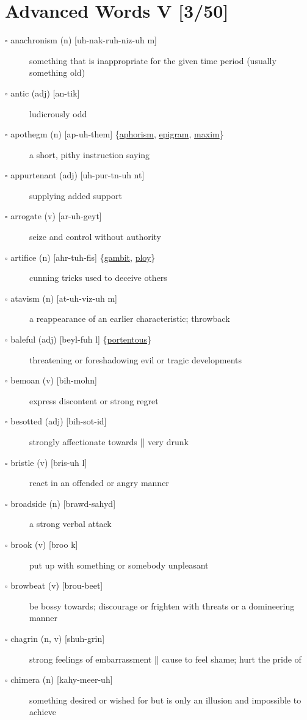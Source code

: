 \documentclass[11pt]{article}
\begin{document}
\section{Advanced Words V [3/50]}
\label{sec:org13c5537}
\begin{description}
\item[{$\square$ anachronism (n) [uh-nak-ruh-niz-uh m]}] something that is inappropriate for the given time period (usually something old)
\item[{$\square$ antic (adj) [an-tik]}] ludicrously odd
\item[{$\square$ \label{org3dc6b52}apothegm (n) [ap-uh-them] \{\hyperref[org7a7c9aa]{aphorism}, \hyperref[org46c3fc2]{epigram}, \hyperref[org0130f55]{maxim}\}}] a short, pithy instruction saying
\item[{$\square$ appurtenant (adj) [uh-pur-tn-uh nt] }] supplying added support
\item[{$\square$ arrogate (v)  [ar-uh-geyt]}] seize and control without authority
\item[{$\square$ \label{org79f386c}artifice (n) [ahr-tuh-fis] \{\hyperref[org6115101]{gambit}, \hyperref[orgb05b474]{ploy}\}}] cunning tricks used to deceive others
\item[{$\square$ atavism (n) [at-uh-viz-uh m]}] a reappearance of an earlier characteristic; throwback
\item[{$\square$ \label{org9ff4c94}baleful (adj) [beyl-fuh l] \{\hyperref[org44acd35]{portentous}\}}] threatening or foreshadowing evil or tragic developments
\item[{$\square$ bemoan (v) [bih-mohn]}] express discontent or strong regret
\item[{$\square$ besotted (adj) [bih-sot-id]}] strongly affectionate towards || very drunk
\item[{$\square$ bristle (v) [bris-uh l]}] react in an offended or angry manner
\item[{$\square$ broadside (n) [brawd-sahyd]}] a strong verbal attack
\item[{$\square$ brook (v) [broo k]}] put up with something or somebody unpleasant
\item[{$\square$ browbeat (v) [brou-beet]}] be bossy towards; discourage or frighten with threats or a domineering manner
\item[{$\square$ chagrin (n, v) [shuh-grin]}] strong feelings of embarrassment || cause to feel shame; hurt the pride of
\item[{$\square$ chimera (n) [kahy-meer-uh]}] something desired or wished for but is only an illusion and impossible to achieve

\end{description}
\end{document}
